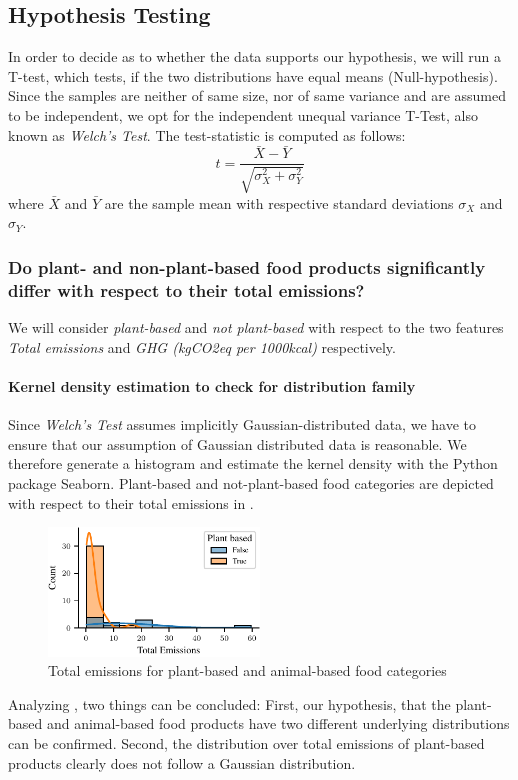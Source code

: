 \documentclass{article}
\begin{document}
\subsection*{Hypothesis Testing}
In order  to decide as to whether the data supports our hypothesis, we will run a T-test, which tests, if the two distributions have equal means (Null-hypothesis).  Since the samples are neither of same size, nor of same variance and are assumed to be independent, we opt for the independent unequal variance T-Test, also known as \textit{Welch's Test}. %
The test-statistic is computed as follows:
\begin{equation}\label{eq:t-test}
  t = \frac{\bar{X}-\bar{Y}}{\sqrt{\sigma^2_{X}+\sigma^2_{Y}}}
\end{equation}
where $\bar{X}$ and  $\bar{Y}$ are the sample mean with respective standard deviations $\sigma_{X}$ and $\sigma_{Y}$.

\subsubsection*{Do plant- and non-plant-based food products significantly differ with respect to their total emissions?}


 We will consider \textit{plant-based} and \textit{not plant-based} with respect to  the two features \textit{Total emissions} and \textit{GHG (kgCO2eq per 1000kcal)} respectively.
\paragraph*{Kernel density estimation to check for distribution family} Since \textit{Welch's Test} assumes implicitly Gaussian-distributed data, we have to ensure that our assumption of Gaussian distributed data is reasonable.  We therefore generate a histogram and estimate the kernel density with the Python package Seaborn. \cite{Seaborn} Plant-based and not-plant-based food categories are depicted with respect to their total emissions in .
\begin{figure}[h]
  \label{fig:emissions}
  \centering
  \includegraphics[width=0.5\textwidth]{figures/emissions.pdf}
  \caption{Total emissions for plant-based and animal-based food categories}
  \label{fig:emissions}
\end{figure}
Analyzing , two things can be concluded: First, our hypothesis, that the plant-based and animal-based food products have two different underlying distributions can be confirmed. Second, the distribution over total emissions of plant-based products clearly does not follow a Gaussian distribution. 
\end{document}
